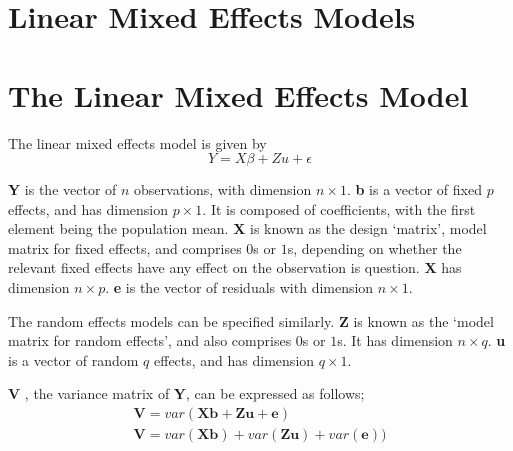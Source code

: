 \documentclass[Chap4main.tex]{subfiles}
\begin{document}
\newpage
\section{Linear Mixed Effects Models}


\section{The Linear Mixed Effects Model}
The linear mixed effects model is given by
\begin{equation}
Y = X\beta + Zu + \epsilon
\end{equation}


\textbf{Y} is the vector of $n$ observations, with dimension $n
\times 1$. \textbf{b} is a vector of fixed $p$ effects, and has
dimension $p \times 1$. It is composed of coefficients, with the
first element being the population mean.  \textbf{X} is known as
the design `matrix', model matrix for fixed effects, and comprises
$0$s or $1$s, depending on whether the relevant fixed effects have
any effect on the observation is question. \textbf{X} has
dimension $n \times p$. \textbf{e} is the vector of residuals with
dimension $n \times 1$.

The random effects models can be specified similarly. \textbf{Z}
is known as the `model matrix for random effects', and also
comprises $0$s or $1$s. It has dimension $n \times q$. \textbf{u
}is a vector of random $q$ effects, and has dimension $q \times
1$.


\textbf{V} , the variance matrix of \textbf{Y}, can be expressed
as follows;
\begin{eqnarray}
\textbf{V}= var ( \textbf{Xb} + \textbf{Zu} + \textbf{e})\\
\textbf{V}= var ( \textbf{Xb} ) + var (\textbf{Zu}) +
var(\textbf{e}))
\end{eqnarray}
\end{document}
